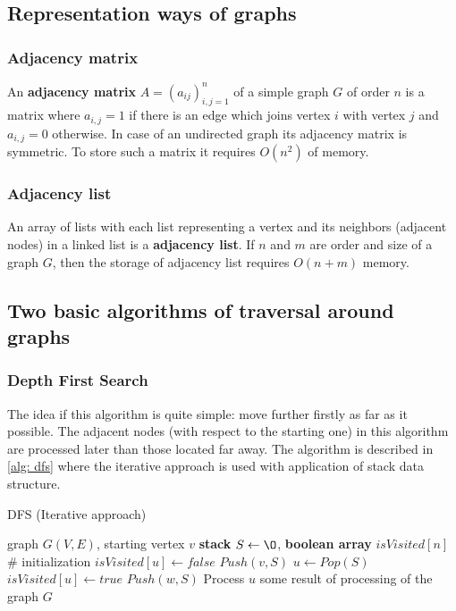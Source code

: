 \documentclass[12pt, bachelor, substylefile = algo_title.rtx]{disser}
\theoremstyle{definition}
\begin{document}
\subsection{Representation ways of graphs}
\subsubsection{Adjacency matrix}
An \textbf{adjacency matrix} $A = (a_{ij})_{i,j=1}^n$ of a simple graph $G$ of order $n$ is a matrix where $a_{i,j} = 1$ if there is an edge which joins vertex $i$ with vertex $j$ and $a_{i,j} = 0$ otherwise. In case of an undirected graph its adjacency matrix is symmetric. To store such a matrix it requires $O(n^2)$ of memory.
\subsubsection{Adjacency list}
An array of lists with each list representing a vertex and its neighbors (adjacent nodes) in a linked list is a \textbf{adjacency list}. If $n$ and $m$ are order and size of a graph $G$, then the storage of adjacency list requires $O(n+m)$ memory.

\subsection{Two basic algorithms of traversal around graphs}
\subsubsection{Depth First Search}
The idea if this algorithm is quite simple: move further firstly as far as it possible. The adjacent nodes (with respect to the starting one) in this algorithm are processed later than those located far away. The algorithm is described in \ref{alg: dfs} where the iterative approach is used with application of stack data structure.
\begin{algorithm}[!h]
\caption{DFS (Iterative approach)}
\label{alg: dfs}
\begin{algorithmic}

\Require graph $G(V, E)$, starting vertex $v$
\State \textbf{stack} $S \gets \O$, \textbf{boolean array} $isVisited[n]$\\
\# initialization
	\State $isVisited[u] \gets false$
\EndFor
\State $Push(v, S)$
	\State $u \gets Pop(S)$
		\State $isVisited[u] \gets true$
			\State $Push(w, S)$
		\EndFor
		\State Process $u$	
	\EndIf
\EndWhile
\Ensure some result of processing of the graph $G$
\end{algorithmic}
\end{algorithm}
\end{document}
